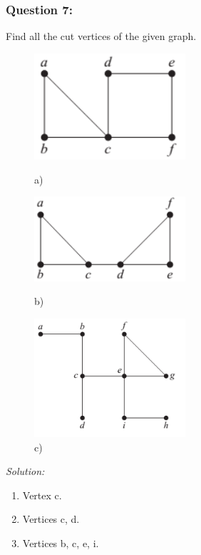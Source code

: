 \documentclass[a4paper]{article}
\begin{document}
	\subsubsection*{Question 7:}
	Find all the cut vertices of the given graph.
	\begin{figure}[H]
		\begin{minipage}{0.3\textwidth}
			\centering
			\includegraphics[width=0.5\textwidth]{tut97_1.png}
			\caption*{a)}
		\end{minipage}
		\begin{minipage}{0.3\textwidth}
			\centering
			\includegraphics[width=0.5\textwidth]{tut97_2.png}
			\caption*{b)}
		\end{minipage}
		\begin{minipage}{0.3\textwidth}
			\centering
			\includegraphics[width=0.5\textwidth]{tut97_3.png}
			\caption*{c)}
		\end{minipage}
	\end{figure}
	\emph{Solution:} \\
	\begin{enumerate}[label = \alph*)]
	    \item Vertex c.
	    \item Vertices c, d.
	    \item Vertices b, c, e, i.
	\end{enumerate}
\end{document}
